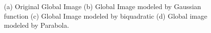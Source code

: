 \begin{figure}[t]
{\label{fig:subfig2} }   \caption[Optional caption for list of figures] {(a)
Original Global Image (b) Global Image modeled by Gaussian function (c) Global
Image modeled by biquadratic (d) Global image modeled by Parabola.}
\label{fig:globcomp}
\end{figure}


